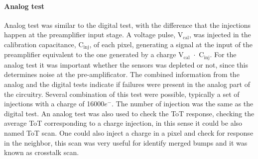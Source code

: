 \paragraph{Analog test}
Analog test was similar to the digital test, with the difference that the injections happen at the preamplifier input stage. A voltage pulse, V$_{\mathrm{cal}}$, was injected in the calibration capacitance, C$_{\mathrm{inj}}$, of each pixel, generating a signal at the input of the preamplifier equivalent to the one generated by a charge V$_{\mathrm{cal}}$~$\cdot$~C$_{\mathrm{inj}}$.
For the analog test it was important whether the sensors was depleted or not, since this determines noise at the pre-amplificator. The combined information from the analog and the digital tests indicate if failures were present in the analog part of the circuitry. Several combination of this test were possible, typically a set of injections with a charge of 16000$e^-$. The number of injection was the same as the digital test. An analog test was also used to check the ToT response, checking the average ToT corresponding to a charge injection, in this sense it could be also named ToT scan. One could also inject a charge in a pixel and check for response in the neighbor, this scan was very useful for identify merged bumps and it was known as crosstalk scan.

